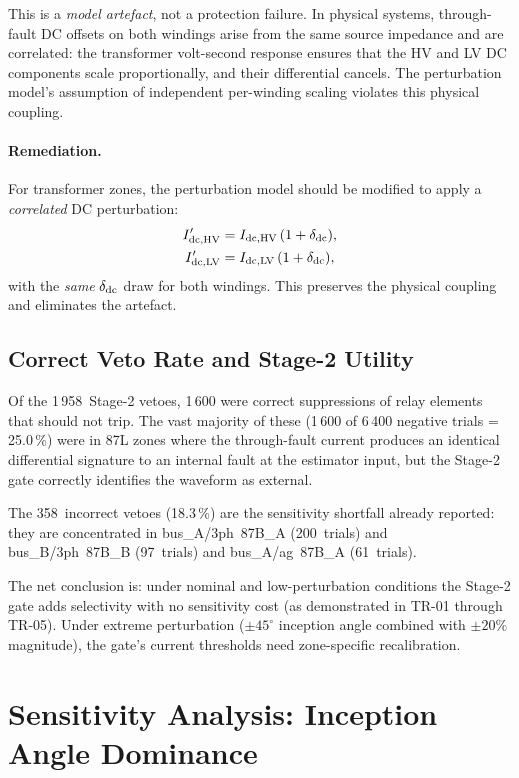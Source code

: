 \documentclass[12pt,a4paper]{article}
\begin{document}
This is a \emph{model artefact}, not a protection failure.  In physical
systems, through-fault DC offsets on both windings arise from the same
source impedance and are correlated: the transformer volt-second
response ensures that the HV and LV DC components scale proportionally,
and their differential cancels.  The perturbation model's assumption of
independent per-winding scaling violates this physical coupling.

\paragraph{Remediation.}
For transformer zones, the perturbation model should be modified to
apply a \emph{correlated} DC perturbation:
\begin{align}
  I_{\rm dc,HV}' &= I_{\rm dc,HV}\,(1 + \delta_{\rm dc}),\\
  I_{\rm dc,LV}' &= I_{\rm dc,LV}\,(1 + \delta_{\rm dc}),
\end{align}
with the \emph{same} $\delta_{\rm dc}$ draw for both windings.  This
preserves the physical coupling and eliminates the artefact.

\subsection{Correct Veto Rate and Stage-2 Utility}

Of the 1\,958~Stage-2 vetoes, 1\,600 were correct suppressions of
relay elements that should not trip.  The vast majority of these
(1\,600 of 6\,400 negative trials = 25.0\,\%) were in 87L zones where
the through-fault current produces an identical differential signature
to an internal fault at the estimator input, but the Stage-2 gate
correctly identifies the waveform as external.

The 358~incorrect vetoes (18.3\,\%) are the sensitivity shortfall
already reported: they are concentrated in bus\_A/3ph~87B\_A
(200~trials) and bus\_B/3ph~87B\_B (97~trials) and bus\_A/ag~87B\_A
(61~trials).

The net conclusion is: under nominal and low-perturbation conditions
the Stage-2 gate adds selectivity with no sensitivity cost
(as demonstrated in TR-01 through TR-05).  Under extreme perturbation
($\pm45^\circ$ inception angle combined with $\pm20\%$ magnitude), the
gate's current thresholds need zone-specific recalibration.


\section{Sensitivity Analysis: Inception Angle Dominance}
\end{document}
